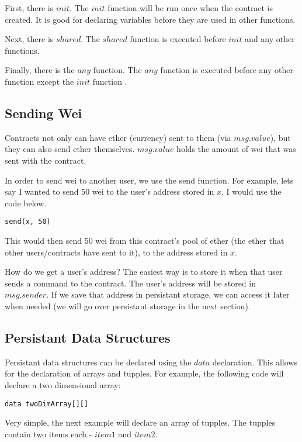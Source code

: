 \documentclass[12pt]{article}
\begin{document}
First, there is $init$. The $init$ function will be run once when the contract is created. It is good for declaring variables before they are used in other functions.

Next, there is $shared$. The $shared$ function is executed before $init$ and any other functions. 

Finally, there is the $any$ function. The $any$ function is executed before any other function except the $init$ function \cite{Serpent}.

\subsection{Sending Wei}
Contracts not only can have ether (currency) sent to them (via $msg.value$), but they can also send ether themselves. $msg.value$ holds the amount of wei that was sent with the contract.

In order to send wei to another user, we use the send function. For example, lets say I wanted to send 50 wei to the user's address stored in $x$, I would use the code below.

\begin{lstlisting}
send(x, 50)
\end{lstlisting}

This would then send 50 wei from this contract's pool of ether (the ether that other users/contracts have sent to it), to the address stored in $x$.

How do we get a user's address? The easiest way is to store it when that user sends a command to the contract. The user's address will be stored in $msg.sender$. If we save that address in persistant storage, we can access it later when needed \cite{Serpent} (we will go over persistant storage in the next section).

\subsection{Persistant Data Structures}

Persistant data structures can be declared using the $data$ declaration. This allows for the declaration of arrays and tupples. For example, the following code will declare a two dimensional array:

\begin{lstlisting}
data twoDimArray[][]
\end{lstlisting}

Very simple, the next example will declare an array of tupples. The tupples contain two items each - $item1$ and $item2$.
\end{document}
